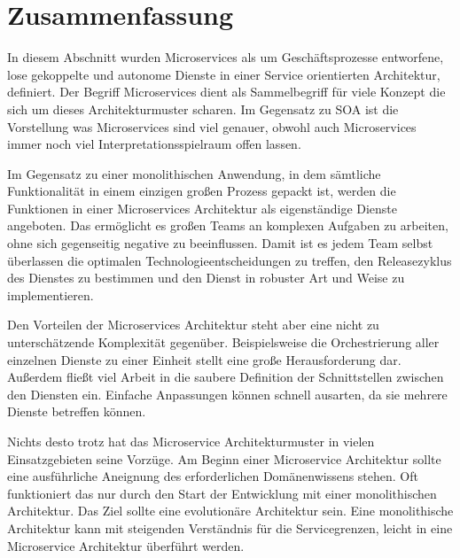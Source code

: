 \section{Zusammenfassung}

In diesem Abschnitt wurden Microservices als um Geschäftsprozesse entworfene, lose gekoppelte und autonome Dienste in einer Service orientierten Architektur, definiert. Der Begriff Microservices dient als Sammelbegriff für viele Konzept die sich um dieses Architekturmuster scharen. Im Gegensatz zu SOA ist die Vorstellung was Microservices sind viel genauer, obwohl auch Microservices immer noch viel Interpretationsspielraum offen lassen.

Im Gegensatz zu einer monolithischen Anwendung, in dem sämtliche Funktionalität in einem einzigen großen Prozess gepackt ist, werden die Funktionen in einer Microservices Architektur als eigenständige Dienste angeboten. Das ermöglicht es großen Teams an komplexen Aufgaben zu arbeiten, ohne sich gegenseitig negative zu beeinflussen. Damit ist es jedem Team selbst überlassen die optimalen Technologieentscheidungen zu treffen, den Releasezyklus des Dienstes zu bestimmen und den Dienst in robuster Art und Weise zu implementieren.

Den Vorteilen der Microservices Architektur steht aber eine nicht zu unterschätzende Komplexität gegenüber. Beispielsweise die Orchestrierung aller einzelnen Dienste zu einer Einheit stellt eine große Herausforderung dar. Außerdem fließt viel Arbeit in die saubere Definition der Schnittstellen zwischen den Diensten ein. Einfache Anpassungen können schnell ausarten, da sie mehrere Dienste betreffen können. 

Nichts desto trotz hat das Microservice Architekturmuster in vielen Einsatzgebieten seine Vorzüge. Am Beginn einer Microservice Architektur sollte eine ausführliche Aneignung des erforderlichen Domänenwissens stehen. Oft funktioniert das nur durch den Start der Entwicklung mit einer monolithischen Architektur. Das Ziel sollte eine evolutionäre Architektur sein. Eine monolithische Architektur kann mit steigenden Verständnis für die Servicegrenzen, leicht in eine Microservice Architektur überführt werden.